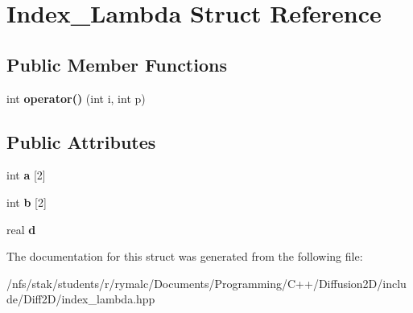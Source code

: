 \hypertarget{structIndex__Lambda}{
\section{Index\_\-Lambda Struct Reference}
\label{structIndex__Lambda}
}
\subsection*{Public Member Functions}
\begin{DoxyCompactItemize}
\item 
\hypertarget{structIndex__Lambda_af8225252f38290763a8aae14a0660a02}{
int {\bfseries operator()} (int i, int p)}
\label{structIndex__Lambda_af8225252f38290763a8aae14a0660a02}

\end{DoxyCompactItemize}
\subsection*{Public Attributes}
\begin{DoxyCompactItemize}
\item 
\hypertarget{structIndex__Lambda_acdf68b7c6f870f4eeb4ee9d8183e0c73}{
int {\bfseries a} \mbox{[}2\mbox{]}}
\label{structIndex__Lambda_acdf68b7c6f870f4eeb4ee9d8183e0c73}

\item 
\hypertarget{structIndex__Lambda_aaa095d0d1b30bc698d5a816ff0199951}{
int {\bfseries b} \mbox{[}2\mbox{]}}
\label{structIndex__Lambda_aaa095d0d1b30bc698d5a816ff0199951}

\item 
\hypertarget{structIndex__Lambda_a34e9306034a5059d37f4ab53d79ea5c7}{
real {\bfseries d}}
\label{structIndex__Lambda_a34e9306034a5059d37f4ab53d79ea5c7}

\end{DoxyCompactItemize}


The documentation for this struct was generated from the following file:\begin{DoxyCompactItemize}
\item 
/nfs/stak/students/r/rymalc/Documents/Programming/C++/Diffusion2D/include/Diff2D/index\_\-lambda.hpp\end{DoxyCompactItemize}
